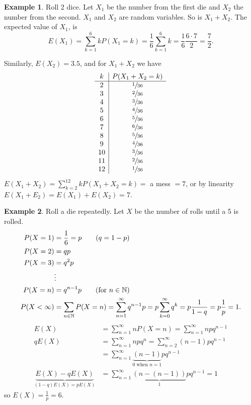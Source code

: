 \documentclass{article}
\newcommand{\N}{\mathbb{N}}
\theoremstyle{definition}
\newtheorem*{example}{Example}
\begin{document}
\begin{example}
    Roll 2 dice. Let $X_1$ be the number from the first die and $X_2$ the number from the second. $X_1$ and $X_2$ are random variables. So is $X_1 + X_2$. The expected value of $X_1$, is
    \[
        E(X_1) = \sum_{k=1}^6 kP(X_1 = k) = \frac{1}{6}\sum_{k=1}^6 k = \frac{1}{6} \frac{6 \cdot 7}{2} = \frac{7}{2}.
    \]
    
    Similarly, $E(X_2) = 3.5$, and for $X_1 + X_2$ we have
    \[\begin{array}{c|c}
        k & P(X_1 + X_2 = k) \\ \hline
        2 & \sfrac{1}{36} \\
        3 & \sfrac{2}{36} \\
        4 & \sfrac{3}{36} \\
        5 & \sfrac{4}{36} \\
        6 & \sfrac{5}{36} \\
        7 & \sfrac{6}{36} \\
        8 & \sfrac{5}{36} \\
        9 & \sfrac{4}{36} \\
        10 & \sfrac{3}{36} \\
        11 & \sfrac{2}{36} \\
        12 & \sfrac{1}{36} \\
    \end{array}\]
    $E(X_1 + X_2) = \sum_{k=2}^{12} kP(X_1 + X_2 = k) = $ a mess $= 7$, or by linearity
    $E(X_1 + E_2) = E(X_1) + E(X_2) = 7$.
\end{example}

\begin{example}
    Roll a die repeatedly. Let $X$ be the number of rolls until a 5 is rolled.
    \begin{align*}
        P(X = 1) &= \frac{1}{6} = p \tag{$q = 1- p$} \\
        P(X = 2) &= qp \\
        P(X = 3) &= q^2 p \\
        &\vdots \\
        P(X = n) &= q^{n-1} p \tag{for $n \in \N$} \\
        P(X < \infty) &= \sum_{n \in \N} P(X = n) = \sum_{n=1}^\infty q^{n-1} p = p\sum_{k=0}^\infty q^k = p \frac{1}{1-q} = p\frac{1}{p} = 1.
    \end{align*}
    \begin{align*}
        E(X) &= \sum_{n=1}^\infty nP(X=n) = \sum_{n=1}^\infty npq^{n-1} \\
        qE(X) &= \sum_{n=1}^\infty npq^n = \sum_{n=2}^\infty (n-1)pq^{n-1} \\
            &= \sum_{n=1}^\infty \underbrace{(n-1)}_{0 \text{ when } n = 1} pq^{n-1} \\
        \underbrace{E(X) - qE(X)}_{(1-q)E(X) = pE(X)} &= \sum_{n = 1}^\infty \underbrace{(n - (n-1))}_{1} pq^{n-1} = 1
    \end{align*}
    so $E(X) = \frac{1}{p} = 6$.
\end{example}
\end{document}
